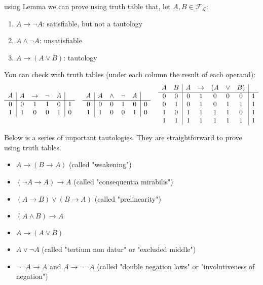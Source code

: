 	\begin{example}
	using Lemma  we can prove using truth table that, let $A,B \in \mathcal{F}_\mathcal{L}$:
	\begin{enumerate}
		\item $A \rightarrow \neg A$: satisfiable, but not a tautology
		\item $A \wedge \neg A$: unsatisfiable
		\item $A \rightarrow (A \vee B)$: tautology
	\end{enumerate}
	You can check with truth tables (under each column the result of each operand):
	$$
	\begin{array}{c | c c c c | c}
		A & A & \rightarrow & \neg & A & \\
		\hline
		0 & 0 & 1 & 1 & 0 & 1\\
		1 & 1 & 0 & 0 & 1 & 0\\
	\end{array}
	\;\;\;\;
	\begin{array}{c | c c c c | c}
		A & A & \wedge & \neg & A & \\
		\hline
		0 & 0 & 0 & 1 & 0 & 0\\
		1 & 1 & 0 & 0 & 1 & 0\\
	\end{array}
	\;\;\;\;
	\begin{array}{c c | c c c c c | c}
		A & B & A & \rightarrow & (A & \vee & B) & \\
		\hline
		0 & 0 & 0 & 1 & 0 & 0 & 0 & 1\\
		0 & 1 & 0 & 1 & 0 & 1 & 1 & 1\\
		1 & 0 & 1 & 1 & 1 & 1 & 0& 1 \\
		1 & 1 & 1 & 1 & 1 & 1 & 1 & 1\\
	\end{array}
	$$
  \end{example}

	Below is a series of important tautologies. They are straightforward to prove using truth tables.
	\begin{itemize}
		\item $A \rightarrow (B \rightarrow A)$ (called "weakening")
		\item $(\neg A \rightarrow A) \rightarrow A$ (called "consequentia mirabilis")
		\item $(A \rightarrow B) \vee (B \rightarrow A)$ (called "prelinearity")
		\item $(A \wedge B) \rightarrow A$
		\item $A \rightarrow (A \vee B)$
		\item $A \vee \neg A$ (called "tertium non datur" or "excluded middle")
		\item $\neg \neg A \rightarrow A$ and $A \rightarrow \neg \neg A$ (called "double negation laws" or "involutiveness of negation")
	\end{itemize}

